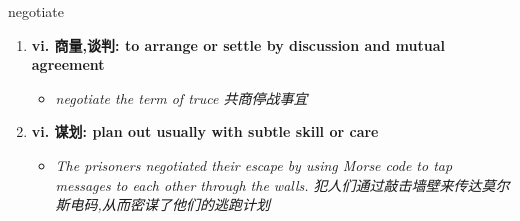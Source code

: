 
\begin{frame}
{\huge negotiate}
\begin{center}
\begin{enumerate}\Large
  \item \textbf{vi. 商量,谈判: to arrange or settle by discussion and mutual agreement}
  \begin{itemize}
    \item \em{\Large{negotiate the term of truce 共商停战事宜}}
  \end{itemize}
  \item \textbf{vi. 谋划: plan out usually with subtle skill or care}
  \begin{itemize}
    \item \em{\Large{The prisoners negotiated their escape by using Morse code to tap messages to each other through the walls. 犯人们通过敲击墙壁来传达莫尔斯电码,从而密谋了他们的逃跑计划}}
  \end{itemize}
\end{enumerate}
\end{center}
\end{frame}
